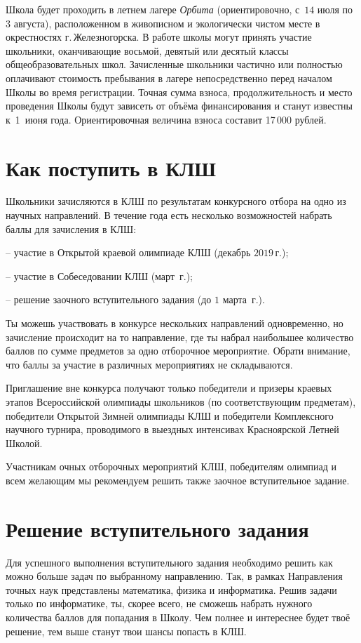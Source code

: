 Школа будет проходить в летнем лагере \textsl{Орбита} (ориентировочно, с~$14$ июля по~$3$ августа), расположенном в живописном и экологически чистом месте в окрестностях г.\,Железногорска. В работе школы могут принять участие школьники, оканчивающие восьмой, девятый или десятый классы общеобразовательных школ. Зачисленные школьники частично или полностью оплачивают стоимость пребывания в лагере непосредственно перед началом Школы во время регистрации. Точная сумма взноса, продолжительность и место проведения Школы будут зависеть от объёма финансирования и станут известны к~1~июня \theyear{} года. Ориентировочная величина взноса составит 17\,000 рублей.

\section*{Как поступить в КЛШ}
Школьники зачисляются в КЛШ по результатам конкурсного отбора на одно из научных направлений. В течение года есть несколько возможностей набрать баллы для зачисления в КЛШ:
\begin{compactenum}
	\item[–] участие в Открытой краевой олимпиаде КЛШ (декабрь $2019$\,г.);
	\item[–] участие в Собеседовании КЛШ (март \theyear{}\,г.);
	\item[–] решение заочного вступительного задания (до $1$ марта \theyear{}\,г.).
\end{compactenum}

Ты можешь участвовать в конкурсе нескольких направлений одновременно, но зачисление происходит на то направление, где ты набрал наибольшее количество баллов по сумме предметов за одно отборочное мероприятие. Обрати внимание, что баллы за участие в различных мероприятиях не складываются.

Приглашение вне конкурса получают только победители и призеры краевых этапов Всероссийской олимпиады школьников (по соответствующим предметам), победители Открытой Зимней олимпиады КЛШ и победители Комплексного научного турнира, проводимого в выездных интенсивах Красноярской Летней Школой.

Участникам очных отборочных мероприятий КЛШ, победителям олимпиад и всем желающим мы рекомендуем решить также заочное вступительное задание.

\section*{Решение вступительного задания}
Для успешного выполнения вступительного задания необходимо решить как можно больше задач по выбранному направлению. Так, в рамках Направления точных наук представлены математика, физика и информатика. Решив задачи только по информатике, ты, скорее всего, не сможешь набрать нужного количества баллов для попадания в Школу. Чем полнее и интереснее будет твоё решение, тем выше станут твои шансы попасть в КЛШ.


